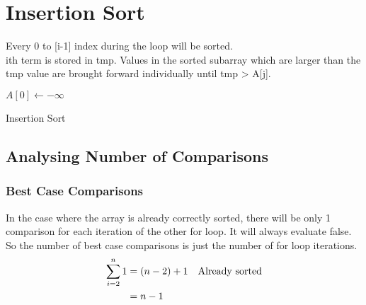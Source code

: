 \documentclass[english, 10pt]{article}
\begin{document}
\section{Insertion Sort}

Every 0 to [i-1] index during the loop will be sorted. \\
ith term is stored in tmp. Values in the sorted subarray which are larger than the tmp value are brought forward individually until tmp > A[j]. \\

\begin{algorithm}
$A[0] \gets -\infty$\;
\caption{Insertion Sort}
\end{algorithm}

\subsection{Analysing Number of Comparisons}

\subsubsection{Best Case Comparisons}
In the case where the array is already correctly sorted, there will be only 1 comparison for each iteration of the other for loop.
It will always evaluate false.
So the number of best case comparisons is just the number of for loop iterations.
\begin{align*}
    \sum_{i=2}^{n} 1 &= (n-2)+1 & \text{Already sorted} \\
    &= n-1
\end{align*}
\end{document}
